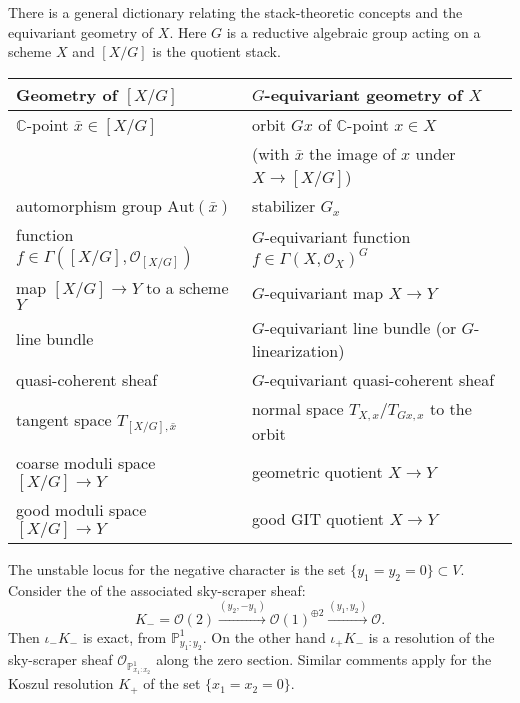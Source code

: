 \documentclass[12pt]{article}
\begin{document}
\begin{remark}
There is a general dictionary relating the stack-theoretic concepts and the equivariant geometry of $X$. Here $G$ is a reductive algebraic group acting on a scheme $X$ and $[X/G]$ is the quotient stack.
\begin{center}
    \begin{tabular}{|l|l|}
    \hline
    \textbf{Geometry of $[X/G]$} & \textbf{$G$-equivariant geometry of $X$} \\[1ex]
    \hline
    $\mathbb{C}$-point $\bar{x} \in [X/G]$ 
      & orbit $Gx$ of $\mathbb{C}$-point $x \in X$ \\
      & (with $\bar{x}$ the image of $x$ under $X \to [X/G]$) \\[1ex]
    \hline
    automorphism group $\mathrm{Aut}(\bar{x})$ 
      & stabilizer $G_x$ \\[1ex]
    \hline
    function $f \in \Gamma([X/G],\mathcal{O}_{[X/G]})$ 
      & $G$-equivariant function $f \in \Gamma(X,\mathcal{O}_X)^G$ \\[1ex]
    \hline
    map $[X/G] \to Y$ to a scheme $Y$ 
      & $G$-equivariant map $X \to Y$ \\[1ex]
    \hline
    line bundle 
      & $G$-equivariant line bundle (or $G$-linearization) \\[1ex]
    \hline
    quasi-coherent sheaf 
      & $G$-equivariant quasi-coherent sheaf \\[1ex]
    \hline
    tangent space $T_{[X/G],\bar{x}}$ 
      & normal space $T_{X,x}/T_{Gx,x}$ to the orbit \\[1ex]
    \hline
    coarse moduli space $[X/G] \to Y$ 
      & geometric quotient $X \to Y$ \\[1ex]
    \hline
    good moduli space $[X/G] \to Y$ 
      & good GIT quotient $X \to Y$ \\[1ex]
    \hline
    \end{tabular}
\end{center}
\end{remark}

The unstable locus for the negative character is the set
$\{y_1 = y_2 = 0\} \subset V$. Consider the  of the associated sky-scraper sheaf:
\[
K_{-} = \mathcal{O}(2) \xrightarrow{(y_2,-y_1)} \mathcal{O}(1)^{\oplus 2} 
\xrightarrow{(y_1,y_2)} \mathcal{O}.
\]
Then $\iota_{-}K_{-}$ is exact,  from 
$\mathbb{P}^1_{y_1:y_2}$. On the other hand $\iota_{+}K_{-}$ is a resolution of the sky-scraper 
sheaf $\mathcal{O}_{\mathbb{P}^1_{x_1:x_2}}$ along the zero section. Similar comments apply for 
the Koszul resolution $K_{+}$ of the set $\{x_1 = x_2 = 0\}$.
\end{document}
